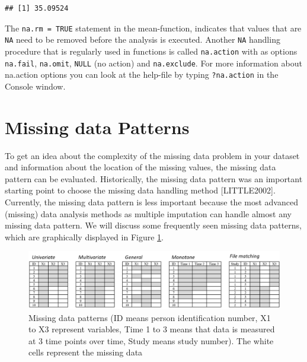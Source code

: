 \documentclass[]{book}
\newenvironment{Shaded}{\begin{snugshade}}{\end{snugshade}}
\newcommand{\KeywordTok}[1]{\textcolor[rgb]{0.13,0.29,0.53}{\textbf{#1}}}
\newcommand{\DataTypeTok}[1]{\textcolor[rgb]{0.13,0.29,0.53}{#1}}
\newcommand{\OtherTok}[1]{\textcolor[rgb]{0.56,0.35,0.01}{#1}}
\newcommand{\OperatorTok}[1]{\textcolor[rgb]{0.81,0.36,0.00}{\textbf{#1}}}
\newcommand{\NormalTok}[1]{#1}
\begin{document}
\begin{Shaded}
\end{Shaded}

\begin{verbatim}
## [1] 35.09524
\end{verbatim}

The \texttt{na.rm\ =\ TRUE} statement in the mean-function, indicates
that values that are \texttt{NA} need to be removed before the analysis
is executed. Another \texttt{NA} handling procedure that is regularly
used in functions is called \texttt{na.action} with as options
\texttt{na.fail}, \texttt{na.omit}, \texttt{NULL} (no action) and
\texttt{na.exclude}. For more information about na.action options you
can look at the help-file by typing \texttt{?na.action} in the Console
window.

\section{Missing data Patterns}\label{missing-data-patterns}

To get an idea about the complexity of the missing data problem in your
dataset and information about the location of the missing values, the
missing data pattern can be evaluated. Historically, the missing data
pattern was an important starting point to choose the missing data
handling method {[}LITTLE2002{]}. Currently, the missing data pattern is
less important because the most advanced (missing) data analysis methods
as multiple imputation can handle almost any missing data pattern. We
will discuss some frequently seen missing data patterns, which are
graphically displayed in Figure \ref{fig:fig2-2}.

\begin{figure}

{\centering \includegraphics[width=0.9\linewidth]{images/fig2.2} 

}

\caption{Missing data patterns (ID means person identification number, X1 to X3 represent variables, Time 1 to 3 means that data is measured at 3 time points over time, Study means study number). The white cells represent the missing data}\label{fig:fig2-2}
\end{figure}
\end{document}
